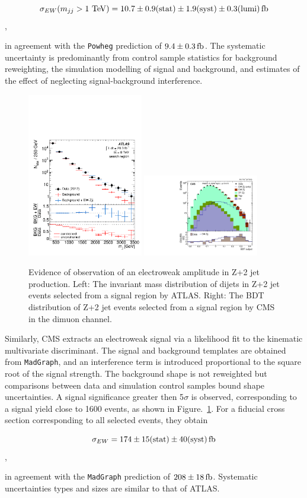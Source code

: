 $$\sigma_{EW} (m_{jj} > 1 \TeV) = 10.7 \pm 0.9 \rm{(stat)} \pm 1.9 \rm{(syst)} \pm 0.3 \rm{(lumi)} \rm{\,fb}$$,

in agreement with the \texttt{Powheg} prediction of $9.4\pm0.3 \rm{\,fb}$.  The systematic uncertainty is predominantly from
control sample statistics for background reweighting, the simulation modelling of signal and background,
and estimates of the effect of neglecting signal-background interference.

\begin{figure}[p]
    \centering
    \includegraphics[width=0.45\textwidth]{figures/ss-exclboson-z2j-atlas8tev.pdf}
    \includegraphics[width=0.45\textwidth]{figures/ss-exclboson-z2j-cms8tev.pdf}
    \caption{Evidence of observation of an electroweak amplitude in Z+2 jet production.
    Left:  The invariant mass distribution of dijets in Z+2 jet events selected
     from a signal region by ATLAS.
    Right:  The BDT distribution of Z+2 jet events selected from a signal region
    by CMS in the dimuon channel.}
    \label{fig:ss-exclboson-z2j-8tev}
\end{figure}

Similarly, CMS extracts an electroweak signal via a likelihood fit to the kinematic multivariate discriminant.  The signal and background
templates are obtained from \texttt{MadGraph}, and an interference term is introduced proportional to the square root of the signal strength.
The background shape is not reweighted but comparisons between data and simulation control samples bound shape uncertainties.  A signal significance
greater then 5$\sigma$ is observed, corresponding to a signal yield close to 1600 events, as shown in Figure.~\ref{fig:ss-exclboson-z2j-8tev}.
For a fiducial cross section corresponding to all selected events, they obtain

$$\sigma_{EW} = 174 \pm 15 \rm{(stat)} \pm 40 \rm{(syst)} \rm{\,fb}$$,

in agreement with the \texttt{MadGraph} prediction of $208 \pm 18 \rm{\,fb}$.  Systematic uncertainties types and sizes are similar to that of ATLAS.
